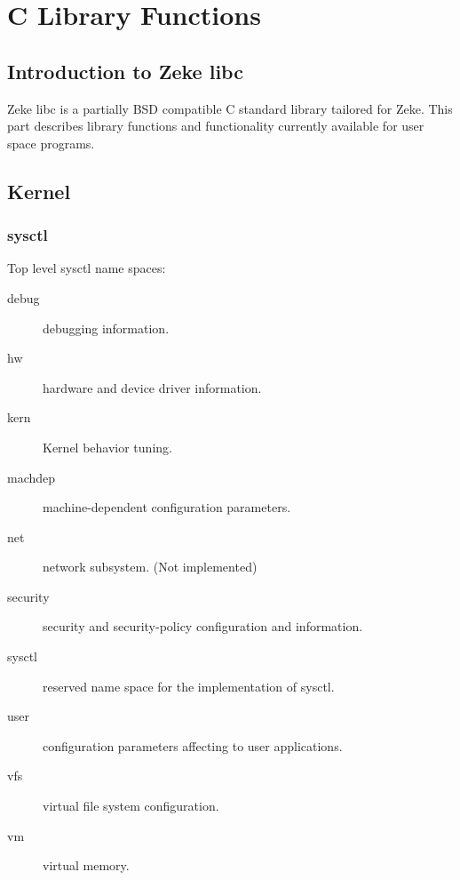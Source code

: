 \part{C Library Functions}

\chapter{Introduction to Zeke libc}

Zeke libc is a partially BSD compatible C standard library tailored for Zeke.
This part describes library functions and functionality currently available for
user space programs.

\chapter{Kernel}
\section{sysctl}

Top level sysctl name spaces:

\begin{description}
\item[debug]    debugging information.
\item[hw]       hardware and device driver information.
\item[kern]     Kernel behavior tuning.
\item[machdep]  machine-dependent configuration parameters.
\item[net]      network subsystem. (Not implemented)
\item[security] security and security-policy configuration and information.
\item[sysctl]   reserved name space for the implementation of sysctl.
\item[user]     configuration parameters affecting to user applications.
\item[vfs]      virtual file system configuration.
\item[vm]       virtual memory.
\end{description}

